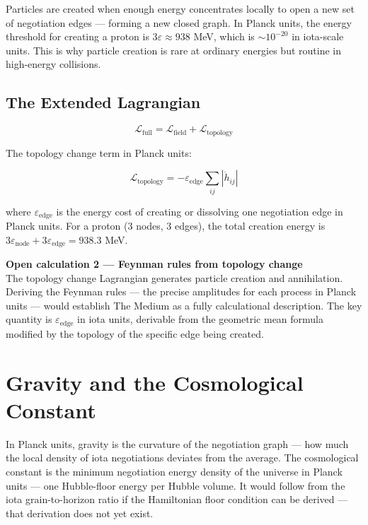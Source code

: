 \documentclass[11pt,letterpaper]{article}
\newenvironment{plainbox}{\begin{tcolorbox}[colback=blue!3!white,colframe=blue!40!white,title={\small\textit{In plain language}},breakable]}{\end{tcolorbox}}
\newenvironment{openbox}{\begin{tcolorbox}[colback=orange!5!white,colframe=orange!60!black,title={\small\textit{Open calculation}},breakable]}{\end{tcolorbox}}
\begin{document}
\begin{plainbox}
Particles are created when enough energy concentrates locally to open a new set of negotiation edges --- forming a new closed graph. In Planck units, the energy threshold for creating a proton is $3\varepsilon \approx 938$ MeV, which is ${\sim}10^{-20}$ in iota-scale units. This is why particle creation is rare at ordinary energies but routine in high-energy collisions.
\end{plainbox}

\subsection{The Extended Lagrangian}
\label{sec:org183855a}

\begin{equation}
\mathcal{L}_\text{full} = \mathcal{L}_\text{field} + \mathcal{L}_\text{topology}
\end{equation}

The topology change term in Planck units:

\begin{equation}
\mathcal{L}_\text{topology} = -\varepsilon_\text{edge} \sum_{ij} |\dot{h}_{ij}|
\end{equation}

where \(\varepsilon_\text{edge}\) is the energy cost of creating or dissolving one negotiation edge in Planck units. For a proton (3 nodes, 3 edges), the total creation energy is \(3\varepsilon_\text{node} + 3\varepsilon_\text{edge} = 938.3\) MeV.

\begin{openbox}
\textbf{Open calculation 2 --- Feynman rules from topology change}\\[4pt]
The topology change Lagrangian generates particle creation and annihilation. Deriving the Feynman rules --- the precise amplitudes for each process in Planck units --- would establish The Medium as a fully calculational description. The key quantity is $\varepsilon_\text{edge}$ in iota units, derivable from the geometric mean formula modified by the topology of the specific edge being created.
\end{openbox}

\section{Gravity and the Cosmological Constant}
\label{sec:orgc113f6e}

\begin{plainbox}
In Planck units, gravity is the curvature of the negotiation graph --- how much the local density of iota negotiations deviates from the average. The cosmological constant is the minimum negotiation energy density of the universe in Planck units --- one Hubble-floor energy per Hubble volume. It would follow from the iota grain-to-horizon ratio if the Hamiltonian floor condition can be derived --- that derivation does not yet exist.
\end{plainbox}
\end{document}
